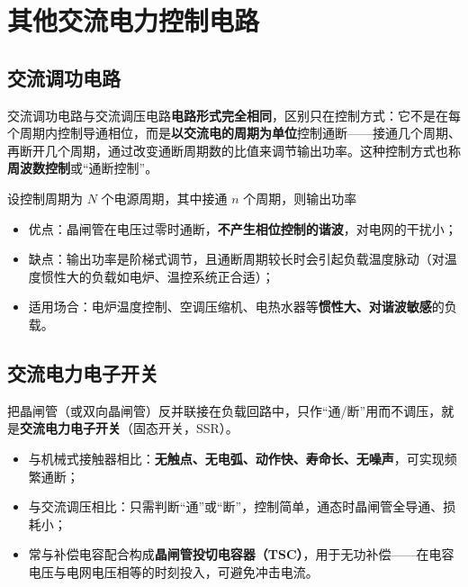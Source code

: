 
\section{其他交流电力控制电路}

\subsection{交流调功电路}

交流调功电路与交流调压电路\textbf{电路形式完全相同}，区别只在控制方式：它不是在每个周期内控制导通相位，而是\textbf{以交流电的周期为单位}控制通断——接通几个周期、再断开几个周期，通过改变通断周期数的比值来调节输出功率。这种控制方式也称\textbf{周波数控制}或“通断控制”。

设控制周期为 $N$ 个电源周期，其中接通 $n$ 个周期，则输出功率


\begin{itemize}
  \item 优点：晶闸管在电压过零时通断，\textbf{不产生相位控制的谐波}，对电网的干扰小；
  \item 缺点：输出功率是阶梯式调节，且通断周期较长时会引起负载温度脉动（对温度惯性大的负载如电炉、温控系统正合适）；
  \item 适用场合：电炉温度控制、空调压缩机、电热水器等\textbf{惯性大、对谐波敏感}的负载。
\end{itemize}

\subsection{交流电力电子开关}

把晶闸管（或双向晶闸管）反并联接在负载回路中，只作“通/断”用而不调压，就是\textbf{交流电力电子开关}（固态开关，SSR）。

\begin{itemize}
  \item 与机械式接触器相比：\textbf{无触点、无电弧、动作快、寿命长、无噪声}，可实现频繁通断；
  \item 与交流调压相比：只需判断“通”或“断”，控制简单，通态时晶闸管全导通、损耗小；
  \item 常与补偿电容配合构成\textbf{晶闸管投切电容器（TSC）}，用于无功补偿——在电容电压与电网电压相等的时刻投入，可避免冲击电流。
\end{itemize}

